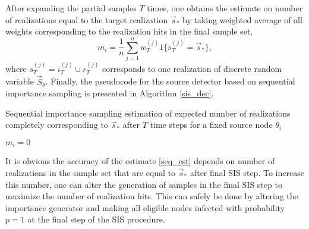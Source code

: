 \documentclass[times, utf8, diplomski]{fer}
\begin{document}
 After expanding the partial samples $T$ times, one obtains the estimate on number of realizations equal to the target realization $\vec s_*$ by taking weighted average of all weights corresponding to the realization hits in the final sample set,
\begin{equation}
m_i = \frac{1}{n} \sum_{j = 1}^{n} w_T^{(j)} 1\{s_T^{(j)} = \vec s_*\},
\label{seq_est}
\end{equation}
where $s_T^{(j)} = i_T^{(j)} \cup r_T^{(j)}$ corresponds to one realization of discrete random variable $\vec S_\theta$. Finally, the pseudocode for the source detector based on sequential importance sampling is presented in Algorithm \ref{sis_dec}.
\begin{algorithm}[h]
\caption{Sequential importance sampling estimation of expected number of realizations completely corresponding to $\vec s_*$ after $T$ time steps for a fixed source node $\theta_i$}
\label{sis_dec}

$m_i = 0$ \\
\end{algorithm}

It is obvious the accuracy of the estimate \ref{seq_est} depends on number of realizations in the sample set that are equal to $\vec s_*$ after final SIS step. To increase this number, one can alter the generation of samples in the final SIS step to maximize the number of realization hits. This can safely be done by altering the importance generator and making all eligible nodes infected with probability $p=1$ at the final step of the SIS procedure. 
\end{document}

